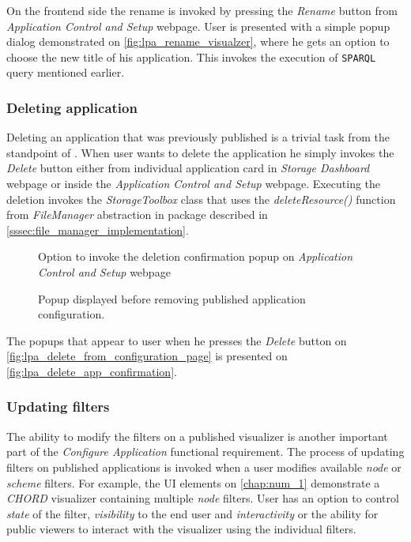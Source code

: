 On the frontend side the rename is invoked by pressing the \textit{Rename} button from \textit{Application Control and Setup} webpage. User is presented with a simple popup dialog demonstrated on \autoref{fig:lpa_rename_visualzer}, where he gets an option to choose the new title of his application. This invokes the execution of \texttt{SPARQL} query mentioned earlier.

\subsubsection{Deleting application}

Deleting an application that was previously published is a trivial task from the standpoint of \lpas{}. When user wants to delete the application he simply invokes the \textit{Delete} button either from individual application card in \textit{Storage Dashboard} webpage or inside the \textit{Application Control and Setup} webpage. Executing the deletion invokes the \textit{StorageToolbox} class that uses the \textit{deleteResource()} function from \textit{FileManager} abstraction in \lpas{} package described in \autoref{sssec:file_manager_implementation}.

\begin{figure}[hbt]
  \caption{Option to invoke the deletion confirmation popup on \textit{Application Control and Setup} webpage}
  \label{fig:lpa_delete_from_configuration_page}
\endminipage\hfill
{}
  \caption{Popup displayed before removing published application configuration.}
  \label{fig:lpa_delete_app_confirmation}
\endminipage\hfill
\end{figure}

The popups that appear to user when he presses the \textit{Delete} button on \autoref{fig:lpa_delete_from_configuration_page} is presented on \autoref{fig:lpa_delete_app_confirmation}.

\subsubsection{Updating filters}
\label{ssssec:updating_filters_implementation}

The ability to modify the filters on a published visualizer is another important part of the \textit{Configure Application} functional requirement. The process of updating filters on published applications is invoked when a user modifies available \textit{node} or \textit{scheme} filters. For example, the UI elements on \autoref{chap:num_1} demonstrate a \textit{CHORD} visualizer containing multiple \textit{node} filters. User has an option to control \textit{state} of the filter, \textit{visibility} to the end user and \textit{interactivity} or the ability for public viewers to interact with the visualizer using the individual filters. 

